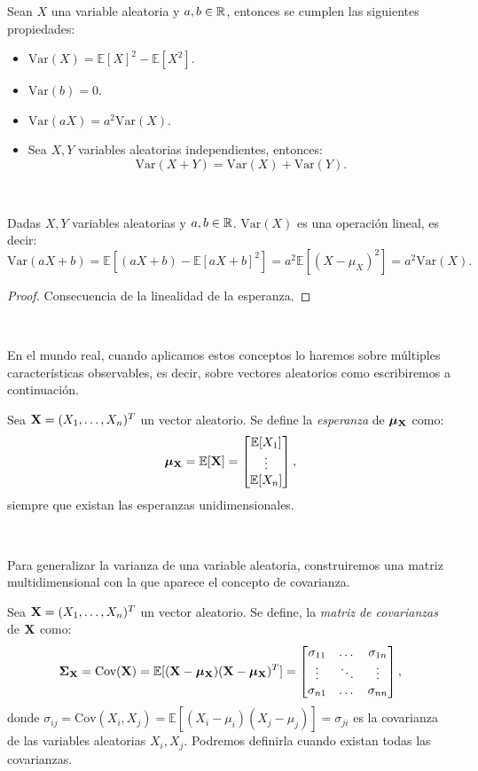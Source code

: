 \documentclass[oneside,openright,titlepage,numbers=noenddot,openany,headinclude,footinclude=true,
cleardoublepage=empty,abstractoff,BCOR=5mm,paper=a4,fontsize=12pt,main=spanish]{scrreprt}
\begin{document}
\begin{proposition}
Sean $X$ una variable aleatoria y $a,b\in \mathbb{R}$, entonces se cumplen las siguientes propiedades:
\begin{itemize}
    \item $\text{Var}(X)=\mathbb{E}[X]^2-\mathbb{E}[X^2].$
    \item $\text{Var}(b)=0.$
    \item $\text{Var}(aX)=a^2\text{Var}(X).$
    \item Sea $X,Y$ variables aleatorias independientes, entonces: $$\text{Var}(X+Y)=\text{Var}(X)+\text{Var}(Y).$$
\end{itemize}
\end{proposition}\

\begin{proposition}
Dadas $X,Y$ variables aleatorias y $a,b\in \mathbb{R}$. $\text{Var}(X)$ es una operación lineal, es decir: $$\text{Var}(aX+b)=\mathbb{E}[(aX+b)-\mathbb{E}[aX+b]^2]=a^2\mathbb{E}[(X-\mu_X)^2]=a^2\text{Var}(X).$$ 
\end{proposition}

\begin{proof}
Consecuencia de la linealidad de la esperanza.
\end{proof}\

En el mundo real, cuando aplicamos estos conceptos lo haremos sobre múltiples características observables, es decir, sobre vectores aleatorios como escribiremos a continuación.\\

\begin{definition}
Sea $\textbf{X}=(X_1,\dots,X_n)^T$ un vector aleatorio. Se define la \textit{esperanza} de $\bm{\mu_{\textbf{X}}}$ como: $$\bm{\mu_{\textbf{X}}}=\mathbb{E}[\textbf{X}]=\begin{bmatrix}
\mathbb{E}[X_1]\\
\vdots\\
\mathbb{E}[X_n]
\end{bmatrix},$$
siempre que existan las esperanzas unidimensionales.
\end{definition}\

Para generalizar la varianza de una variable aleatoria, construiremos una matriz multidimensional con la que aparece el concepto de covarianza.\\

\begin{definition}
Sea $\textbf{X}=(X_1,\dots,X_n)^T$ un vector aleatorio. Se define, la \textit{matriz de covarianzas} de $\textbf{X}$ como: $$\bm{\Sigma_{\textbf{X}}} = \text{Cov}(\textbf{X})=\mathbb{E}[(\textbf{X}-\bm{\mu_{\textbf{X}}})(\textbf{X}-\bm{\mu_{\textbf{X}}})^T]=\begin{bmatrix}
\sigma_{11} & \dots & \sigma_{1n}\\
\vdots & \ddots & \vdots\\
\sigma_{n1} & \dots & \sigma_{nn}
\end{bmatrix},$$
donde $\sigma_{ij}=\text{Cov}(X_i,X_j)=\mathbb{E}[(X_i-\mu_i)(X_j-\mu_j)]=\sigma_{ji}$ es la covarianza de las variables aleatorias $X_i,X_j$. Podremos definirla cuando existan todas las covarianzas.
\end{definition}
\end{document}
